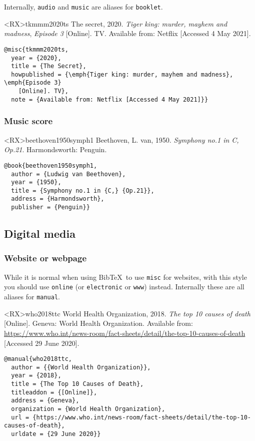 \documentclass[10pt,a4paper]{article}
\newenvironment{info}{%
  \begin{list}{\makebox[2em][c]{\faInfoCircle}}{%
    \setlength{\leftmargin}{2em}
    \setlength{\labelwidth}{2em}
    \setlength{\labelsep}{0pt}}
}{\end{list}}
\begin{document}
\begin{info}\item
Internally, \texttt{audio} and \texttt{music} are aliases for \texttt{booklet}.
\end{info}

\begin{bibexbox}<RX>{tkmmm2020ts}
  The secret, 2020. \emph{Tiger king: murder, mayhem and madness}, \emph{Episode 3} [Online]. TV. Available from: Netflix [Accessed 4 May 2021].
  \tcblower
\begin{Verbatim}
@misc{tkmmm2020ts,
  year = {2020},
  title = {The Secret},
  howpublished = {\emph{Tiger king: murder, mayhem and madness}, \emph{Episode 3}
    [Online]. TV},
  note = {Available from: Netflix [Accessed 4 May 2021]}}
\end{Verbatim}
\end{bibexbox}

\subsubsection*{Music score}

\begin{bibexbox}<RX>{beethoven1950symph1}
  Beethoven, L. van, 1950. \emph{Symphony no.1 in C, Op.21}. Harmondsworth: Penguin.
  \tcblower
\begin{Verbatim}
@book{beethoven1950symph1,
  author = {Ludwig van Beethoven},
  year = {1950},
  title = {Symphony no.1 in {C,} {Op.21}},
  address = {Harmondsworth},
  publisher = {Penguin}}
\end{Verbatim}
\end{bibexbox}

\subsection{Digital media}

\subsubsection*{Website or webpage}

While it is normal when using Bib\TeX\ to use \texttt{misc} for websites,
with this style you should use \texttt{online} (or \texttt{electronic} or \texttt{www}) instead.
Internally these are all aliases for \texttt{manual}.

\begin{bibexbox}<RX>{who2018ttc}
  World Health Organization, 2018. \emph{The top 10 causes of death} [Online]. Geneva: World Health Organization. Available from: \url{https://www.who.int/news-room/fact-sheets/detail/the-top-10-causes-of-death} [Accessed 29 June 2020].
  \tcblower
\begin{Verbatim}
@manual{who2018ttc,
  author = {{World Health Organization}},
  year = {2018},
  title = {The Top 10 Causes of Death},
  titleaddon = {[Online]},
  address = {Geneva},
  organization = {World Health Organization},
  url = {https://www.who.int/news-room/fact-sheets/detail/the-top-10-causes-of-death},
  urldate = {29 June 2020}}
\end{Verbatim}
\end{bibexbox}
\end{document}
